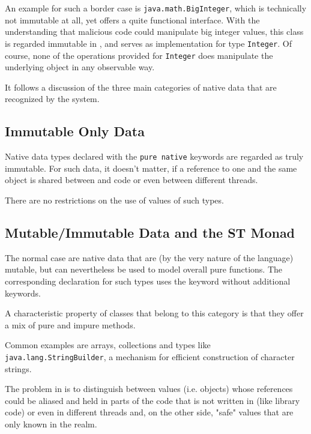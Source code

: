 An example for such a border case is \texttt{java.math.BigInteger}, which is technically not immutable at all, 
yet offers a quite functional interface. 
With the understanding that malicious \java{} code could manipulate big integer values, 
this class is regarded immutable in \frege{}, and serves as implementation for type \texttt{Integer}. Of course, none of the
operations provided for \texttt{Integer} does manipulate the underlying \java{} object in any observable way.

It follows a discussion of the three main categories of native data that are recognized by the \frege{} system.

\subsection{Immutable Only Data}

Native data types declared with the \texttt{pure native} keywords are regarded as truly immutable. For such data, it doesn't matter, if a reference to one and the same object is shared between \java{} and \frege{} code or even between different threads.

There are no restrictions on the use of values of such types.


\subsection{Mutable/Immutable Data and the ST Monad}

The normal case are native data that are (by the very nature of the \java{} language) mutable, but can nevertheless be used to model overall pure functions. The corresponding  declaration for such types uses the keyword  without additional keywords.

A characteristic property of \java{} classes that belong to this category is that they offer a mix of pure and impure methods.

Common examples are arrays, collections and types like \texttt{java.lang.StringBuilder}, a mechanism for efficient construction of character strings.

The problem in \frege{} is to distinguish between values (i.e. \java{} objects) 
whose references could be aliased and held in parts of the code that is not written in \frege{} (like library code) 
or even in different threads and, on the other side, 
"safe" values that are only known in the \frege{} realm.

